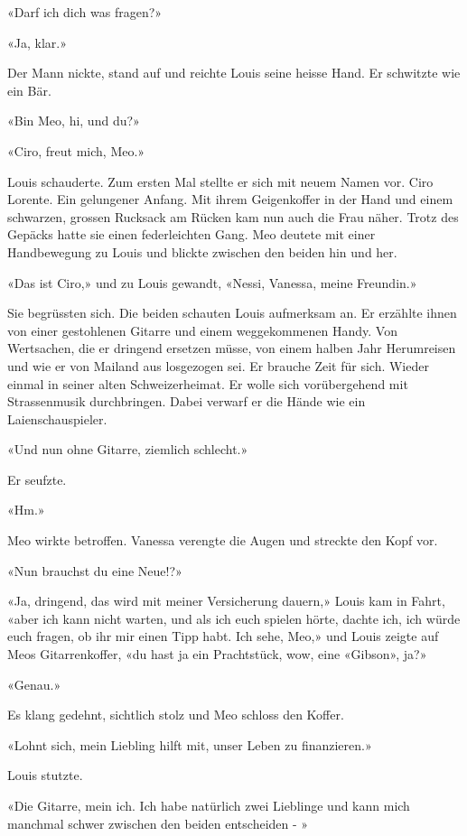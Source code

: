 «Darf ich dich was fragen?»

«Ja, klar.»

Der Mann nickte, stand auf und reichte Louis seine heisse Hand. Er
schwitzte wie ein Bär.

«Bin Meo, hi, und du?»

«Ciro, freut mich, Meo.»

Louis schauderte. Zum ersten Mal stellte er sich mit neuem Namen vor.
Ciro Lorente. Ein gelungener Anfang. Mit ihrem Geigenkoffer in der Hand und einem schwarzen, grossen Rucksack am Rücken kam nun auch die Frau näher. Trotz des Gepäcks hatte sie einen federleichten Gang. Meo deutete mit einer Handbewegung zu Louis und blickte zwischen den beiden hin und her.

«Das ist Ciro,» und zu Louis gewandt, «Nessi, Vanessa, meine Freundin.»

Sie begrüssten sich. Die beiden schauten Louis aufmerksam an.
Er erzählte ihnen von einer gestohlenen Gitarre und einem weggekommenen
Handy. Von Wertsachen, die er dringend ersetzen müsse, von einem halben
Jahr Herumreisen und wie er von Mailand aus losgezogen sei. Er brauche
Zeit für sich. Wieder einmal in seiner alten Schweizerheimat. Er wolle
sich vorübergehend mit Strassenmusik durchbringen.
Dabei verwarf er die Hände wie ein Laienschauspieler.

«Und nun ohne Gitarre, ziemlich schlecht.»

Er seufzte.

«Hm.»

Meo wirkte betroffen. Vanessa verengte die Augen und streckte den
Kopf vor.

«Nun brauchst du eine Neue!?»

«Ja, dringend, das wird mit meiner Versicherung dauern,» Louis kam in Fahrt, 
«aber ich kann nicht warten, und als ich euch spielen hörte,
dachte ich, ich würde euch fragen, ob ihr mir einen Tipp habt. Ich sehe,
Meo,» und Louis zeigte auf Meos Gitarrenkoffer, «du hast ja ein
Prachtstück, wow, eine «Gibson», ja?»

«Genau.»

Es klang gedehnt, sichtlich stolz und Meo schloss den Koffer.

«Lohnt sich, mein Liebling hilft mit, unser Leben zu finanzieren.»

Louis stutzte.

«Die Gitarre, mein ich. Ich habe natürlich zwei Lieblinge und kann mich
manchmal schwer zwischen den beiden entscheiden - »

